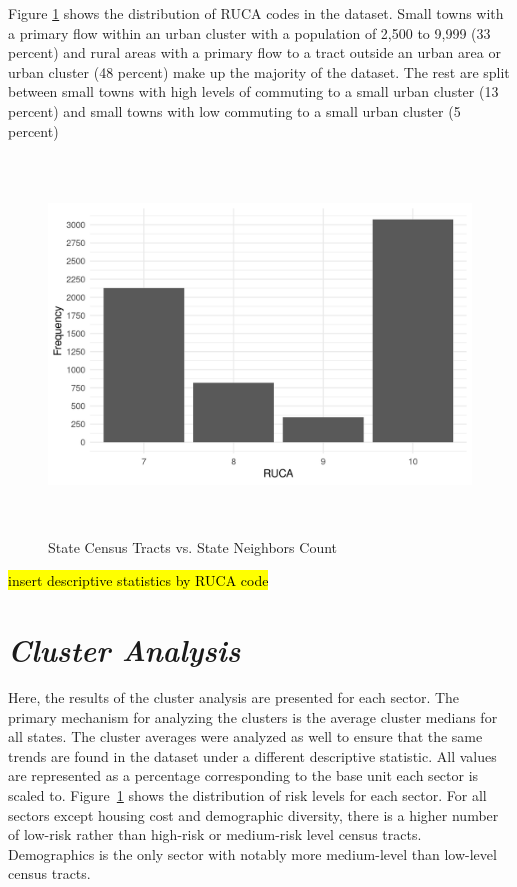 Figure \ref{fig:ruca_frequency} shows the distribution of RUCA codes in the dataset. Small towns with a primary flow within an urban cluster with a population of 2,500 to 9,999 (33 percent) and rural areas with a primary flow to a tract outside an urban area or urban cluster (48 percent) make up the majority of the dataset. The rest are split between small towns with high levels of commuting to a small urban cluster (13 percent) and small towns with low commuting to a small urban cluster  (5 percent)

\begin{figure}[htbp]
    \centering
     \includegraphics[width=1\textwidth, height=10cm]{plots/ruca_frequency.png}
     \caption{State Census Tracts vs. State Neighbors Count}
     \label{fig:ruca_frequency}
 \end{figure}
 

\hl{insert descriptive statistics by RUCA code}

\section{\textit{Cluster Analysis}}

Here, the results of the cluster analysis are presented for each sector. The primary mechanism for analyzing the clusters is the average cluster medians for all states. The cluster averages were analyzed as well to ensure that the same trends are found in the dataset under a different descriptive statistic. All values are represented as a percentage corresponding to the base unit each sector is scaled to. Figure~\ref{fig:ruca_frequency} shows the distribution of risk levels for each sector. For all sectors except housing cost and demographic diversity, there is a higher number of low-risk rather than high-risk or medium-risk level census tracts. Demographics is the only sector with notably more medium-level than low-level census tracts. 

